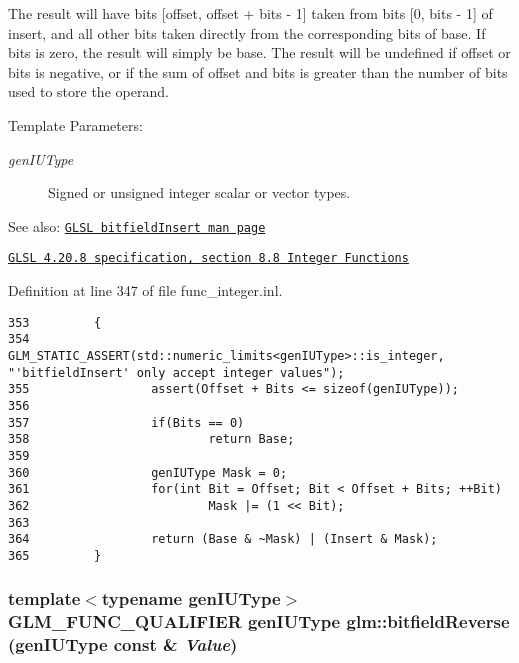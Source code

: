 The result will have bits \mbox{[}offset, offset + bits - 1\mbox{]} taken from bits \mbox{[}0, bits - 1\mbox{]} of insert, and all other bits taken directly from the corresponding bits of base. If bits is zero, the result will simply be base. The result will be undefined if offset or bits is negative, or if the sum of offset and bits is greater than the number of bits used to store the operand.

\begin{Desc}
\item[Template Parameters:]
\begin{description}
\item[{\em genIUType}]Signed or unsigned integer scalar or vector types.\end{description}
\end{Desc}
\begin{Desc}
\item[See also:]\href{http://www.opengl.org/sdk/docs/manglsl/xhtml/bitfieldInsert.xml}{\tt GLSL bitfieldInsert man page} 

\href{http://www.opengl.org/registry/doc/GLSLangSpec.4.20.8.pdf}{\tt GLSL 4.20.8 specification, section 8.8 Integer Functions} \end{Desc}


Definition at line 347 of file func\_\-integer.inl.

\begin{Code}\begin{verbatim}353         {
354                 GLM_STATIC_ASSERT(std::numeric_limits<genIUType>::is_integer, "'bitfieldInsert' only accept integer values");
355                 assert(Offset + Bits <= sizeof(genIUType));
356 
357                 if(Bits == 0)
358                         return Base;
359 
360                 genIUType Mask = 0;
361                 for(int Bit = Offset; Bit < Offset + Bits; ++Bit)
362                         Mask |= (1 << Bit);
363 
364                 return (Base & ~Mask) | (Insert & Mask);
365         }
\end{verbatim}
\end{Code}


\hypertarget{group__core__func__integer_ge55354ee3125593fc17f4cff052e6a10}{
\subsubsection[bitfieldReverse]{\setlength{\rightskip}{0pt plus 5cm}template$<$typename genIUType$>$ GLM\_\-FUNC\_\-QUALIFIER genIUType glm::bitfieldReverse (genIUType const \& {\em Value})}}
\label{group__core__func__integer_ge55354ee3125593fc17f4cff052e6a10}


